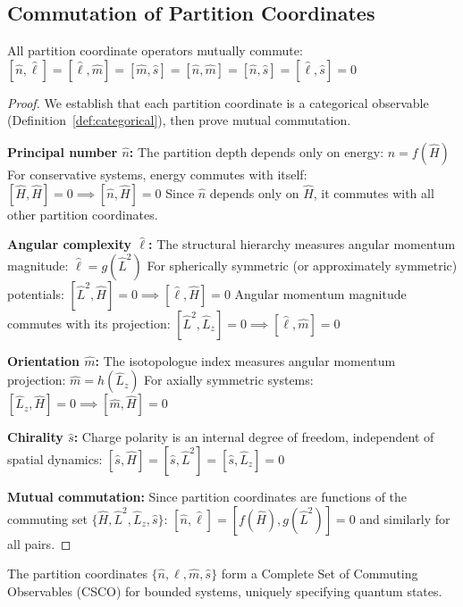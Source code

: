 \subsection{Commutation of Partition Coordinates}

\begin{theorem}
\label{thm:commutation}
All partition coordinate operators mutually commute:
$
[\hat{n}, \hat{\ell}] = [\hat{\ell}, \hat{m}] = [\hat{m}, \hat{s}] = [\hat{n}, \hat{m}] = [\hat{n}, \hat{s}] = [\hat{\ell}, \hat{s}] = 0
$
\end{theorem}

\begin{proof}
We establish that each partition coordinate is a categorical observable (Definition~\ref{def:categorical}), then prove mutual commutation.

\textbf{Principal number $\hat{n}$:} The partition depth depends only on energy:
$
\hat{n} = f(\hat{H})
$
For conservative systems, energy commutes with itself:
$
[\hat{H}, \hat{H}] = 0 \implies [\hat{n}, \hat{H}] = 0
$
Since $\hat{n}$ depends only on $\hat{H}$, it commutes with all other partition coordinates.

\textbf{Angular complexity $\hat{\ell}$:} The structural hierarchy measures angular momentum magnitude:
$
\hat{\ell} = g(\hat{L}^2)
$
For spherically symmetric (or approximately symmetric) potentials:
$
[\hat{L}^2, \hat{H}] = 0 \implies [\hat{\ell}, \hat{H}] = 0
$
Angular momentum magnitude commutes with its projection:
$
[\hat{L}^2, \hat{L}_z] = 0 \implies [\hat{\ell}, \hat{m}] = 0
$

\textbf{Orientation $\hat{m}$:} The isotopologue index measures angular momentum projection:
$
\hat{m} = h(\hat{L}_z)
$
For axially symmetric systems:
$
[\hat{L}_z, \hat{H}] = 0 \implies [\hat{m}, \hat{H}] = 0
$

\textbf{Chirality $\hat{s}$:} Charge polarity is an internal degree of freedom, independent of spatial dynamics:
$
[\hat{s}, \hat{H}] = [\hat{s}, \hat{L}^2] = [\hat{s}, \hat{L}_z] = 0
$

\textbf{Mutual commutation:} Since partition coordinates are functions of the commuting set $\{\hat{H}, \hat{L}^2, \hat{L}_z, \hat{s}\}$:
$
[\hat{n}, \hat{\ell}] = [f(\hat{H}), g(\hat{L}^2)] = 0
$
and similarly for all pairs.
\end{proof}

\begin{corollary}
\label{cor:csco}
The partition coordinates $\{\hat{n}, \hat{\ell}, \hat{m}, \hat{s}\}$ form a Complete Set of Commuting Observables (CSCO) for bounded systems, uniquely specifying quantum states.
\end{corollary}

